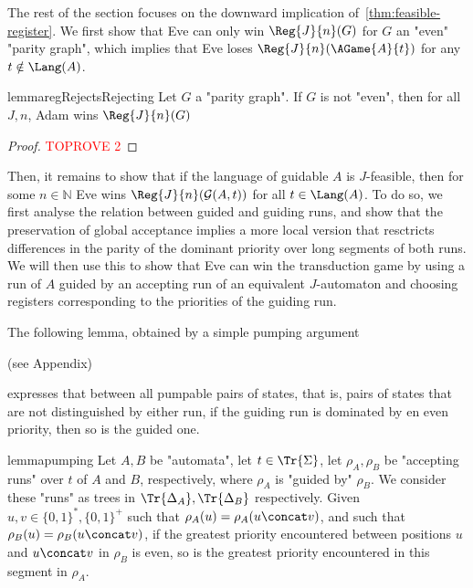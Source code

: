 \documentclass[a4paper,UKenglish,cleveref, autoref, thm-restate]{lipics-v2021}
\newif\ificalp
\newcommand{\NN}{\mathbb{N}}
\newcommand{\G}{\mathcal{G}}
\begin{document}
The rest of the section focuses on the downward implication of~\cref{thm:feasible-register}. We first show that Eve can only win $\Reg{J}{n}(G)$ for $G$ an "even" "parity graph", which implies that Eve loses $\Reg{J}{n}(\AGame{A}{t})$ for any $t\notin \Lang(A)$.



\begin{restatable}{lemma}{regRejectsRejecting}\label{lem:reg-rejects-rejecting}
	Let $G$ a "parity graph". If $G$ is not "even", then for all $J,n$, Adam wins $\Reg{J}{n}(G)$
\end{restatable}

\begin{proof}\textcolor{red}{TOPROVE 2}\end{proof}



Then, it remains to show that if the language of guidable $A$ is $J$-feasible, then for some $n\in \NN$ Eve wins $\Reg{J}{n}(\G(A,t))$ for all $t\in \Lang(A)$.
To do so, we first analyse the relation between guided and guiding runs, and show that the preservation of global acceptance implies a more local version that resctricts differences in the parity of the dominant priority over long segments of both runs. We will then use this to show that Eve can win the transduction game by using a run of $A$ guided by an accepting run of an equivalent $J$-automaton and choosing registers corresponding to the priorities of the guiding run.

The following lemma, obtained by a simple pumping argument 
\ificalp
(see full version)
\else
(see Appendix)
\fi
 expresses that between all pumpable pairs of states, that is, pairs of states that are not distinguished by either run, if the guiding run is dominated by en even priority, then so is the guided one. 

\begin{restatable}{lemma}{pumping}\label{cl:pump}
	Let $A,B$ be "automata", let $t\in \Tr{\Sigma}$, let $\rho_A, \rho_B$ be "accepting runs" over $t$ of $A$ and $B$, respectively, where $\rho_A$ is "guided by" $\rho_B$. We consider these "runs" as trees in $\Tr{\Delta_A},\Tr{\Delta_B}$ respectively. 
	Given $u,v \in \{0,1\}^*, \{0,1\}^+$ such that $\rho_A(u) = \rho_A(u\concat v)$, and such that $\rho_B(u) = \rho_B(u\concat v)$, if the greatest priority encountered between positions $u$ and $u \concat v$ in $\rho_B$ is even, so is the greatest priority encountered in this segment in $\rho_A$.
\end{restatable}
\end{document}
